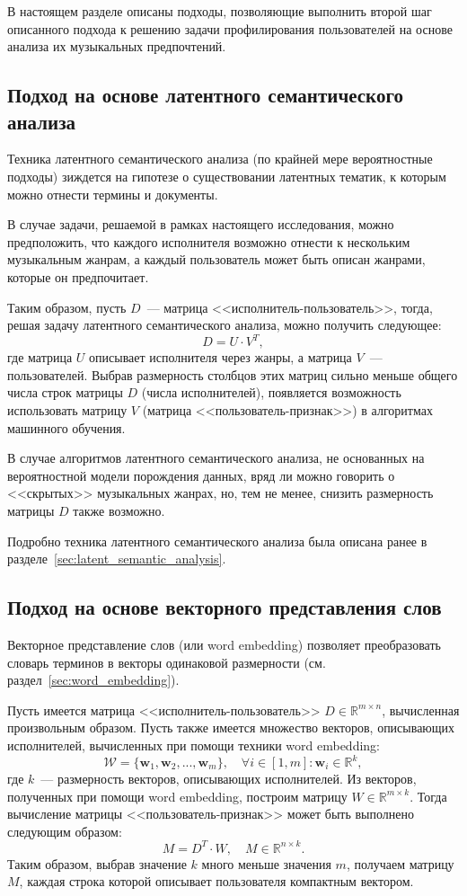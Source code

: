В настоящем разделе описаны подходы, позволяющие выполнить
второй шаг описанного подхода к решению задачи профилирования
пользователей на основе анализа их музыкальных предпочтений.

\subsection{Подход на основе латентного семантического анализа}

Техника латентного семантического анализа (по крайней мере
вероятностные подходы) зиждется на гипотезе о существовании
латентных тематик, к которым можно отнести термины и документы.

В случае задачи, решаемой в рамках настоящего исследования,
можно предположить, что каждого исполнителя возможно отнести
к нескольким музыкальным жанрам, а каждый пользователь может быть
описан жанрами, которые он предпочитает.

Таким образом, пусть $D$~--- матрица <<исполнитель-пользователь>>,
тогда, решая задачу латентного семантического анализа, можно
получить следующее:
\[
    D = U \cdot V^T,
\]
где матрица $U$ описывает исполнителя через жанры, а матрица
$V$~--- пользователей. Выбрав размерность столбцов этих
матриц сильно меньше общего числа строк матрицы $D$ (числа
исполнителей), появляется возможность использовать матрицу $V$
(матрица <<пользователь-признак>>) в алгоритмах машинного обучения.  

В случае алгоритмов латентного семантического анализа, не основанных
на вероятностной модели порождения данных, вряд ли можно говорить о
<<скрытых>> музыкальных жанрах, но, тем не менее, снизить размерность
матрицы $D$ также возможно.

Подробно техника латентного семантического анализа была описана
ранее в разделе~\ref{sec:latent_semantic_analysis}.

\subsection{Подход на основе векторного представления слов}
\label{ssec:docs_word_embedding}

Векторное представление слов (или word embedding) позволяет
преобразовать словарь терминов в векторы одинаковой размерности
(см. раздел~\ref{sec:word_embedding}). 

Пусть имеется матрица <<исполнитель-пользователь>>
$D \in \mathbb{R}^{m \times n}$, вычисленная произвольным
образом. Пусть также имеется множество векторов,
описывающих исполнителей, вычисленных при помощи техники
word embedding: 
\[
    \mathcal{W} = \{\bm{w}_1, \bm{w}_2,..., \bm{w}_m\},\quad
    \forall i \in [1, m] \colon \bm{w}_i \in \mathbb{R}^k,
\]
где $k$~--- размерность векторов, описывающих исполнителей.
Из векторов, полученных при помощи word embedding, построим
матрицу $W \in \mathbb{R}^{m \times k}$. Тогда вычисление матрицы
<<пользователь-признак>> может быть выполнено следующим образом:
\[
    M = D^T \cdot W,\quad M \in \mathbb{R}^{n \times k}.
\]
Таким образом, выбрав значение $k$ много меньше значения $m$,
получаем матрицу $M$, каждая строка которой описывает
пользователя компактным вектором.

